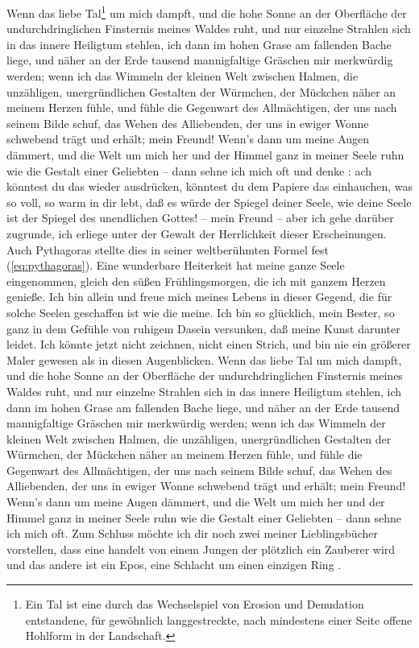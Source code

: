 \documentclass{scrreprt}
\begin{document}
		 Wenn das liebe Tal\footnote{Ein Tal ist eine durch das Wechselspiel von Erosion und Denudation entstandene, für gewöhnlich langgestreckte, nach mindestens einer Seite offene Hohlform in der Landschaft.} um mich dampft, und die hohe Sonne an der Oberfläche der undurchdringlichen Finsternis meines Waldes ruht, und nur einzelne Strahlen sich in das innere Heiligtum stehlen, ich dann im hohen Grase am fallenden Bache liege, und näher an der Erde tausend mannigfaltige Gräschen mir merkwürdig werden; wenn ich das Wimmeln der kleinen Welt zwischen Halmen, die unzähligen, unergründlichen Gestalten der Würmchen, der Mückchen näher an meinem Herzen fühle, und fühle die Gegenwart des Allmächtigen, der uns nach seinem Bilde schuf, das Wehen des Alliebenden, der uns in ewiger Wonne schwebend trägt und erhält; mein Freund! Wenn’s dann um meine Augen dämmert, und die Welt um mich her und der Himmel ganz in meiner Seele ruhn wie die Gestalt einer Geliebten – dann sehne ich mich oft und denke : ach könntest du das wieder ausdrücken, könntest du dem Papiere das einhauchen, was so voll, so warm in dir lebt, daß es würde der Spiegel deiner Seele, wie deine Seele ist der Spiegel des unendlichen Gottes! – mein Freund – aber ich gehe darüber zugrunde, ich erliege unter der Gewalt der Herrlichkeit dieser Erscheinungen. Auch Pythagoras stellte dies in seiner weltberühmten Formel fest (\ref*{eq:pythagoras}). Eine wunderbare Heiterkeit hat meine ganze Seele eingenommen, gleich den süßen Frühlingsmorgen, die ich mit ganzem Herzen genieße. Ich bin allein und freue mich meines Lebens in dieser Gegend, die für solche Seelen geschaffen ist wie die meine. Ich bin so glücklich, mein Bester, so ganz in dem Gefühle von ruhigem Dasein versunken, daß meine Kunst darunter leidet. Ich könnte jetzt nicht zeichnen, nicht einen Strich, und bin nie ein größerer Maler gewesen als in diesen Augenblicken. Wenn das liebe Tal um mich dampft, und die hohe Sonne an der Oberfläche der undurchdringlichen Finsternis meines Waldes ruht, und nur einzelne Strahlen sich in das innere Heiligtum stehlen, ich dann im hohen Grase am fallenden Bache liege, und näher an der Erde tausend mannigfaltige Gräschen mir merkwürdig werden; wenn ich das Wimmeln der kleinen Welt zwischen Halmen, die unzähligen, unergründlichen Gestalten der Würmchen, der Mückchen näher an meinem Herzen fühle, und fühle die Gegenwart des Allmächtigen, der uns nach seinem Bilde schuf, das Wehen des Alliebenden, der uns in ewiger Wonne schwebend trägt und erhält; mein Freund! Wenn’s dann um meine Augen dämmert, und die Welt um mich her und der Himmel ganz in meiner Seele ruhn wie die Gestalt einer Geliebten – dann sehne ich mich oft. Zum Schluss möchte ich dir noch zwei meiner Lieblingsbücher vorstellen, dass eine handelt von einem Jungen der plötzlich ein Zauberer wird \cite{ref5} und das andere ist ein Epos, eine Schlacht um einen einzigen Ring \cite{ref6}.
	
\end{document}
